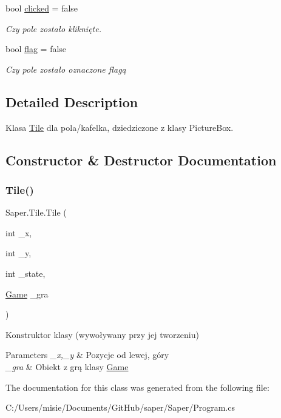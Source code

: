 \begin{DoxyCompactItemize}
\mbox{\label{class_saper_1_1_tile_a0b3e70fcbb158d0d48856f4f1c21e74c}} 
bool \mbox{\hyperlink{class_saper_1_1_tile_a0b3e70fcbb158d0d48856f4f1c21e74c}{clicked}} = false
\begin{DoxyCompactList}\small\item\em Czy pole zostało kliknięte. \end{DoxyCompactList}\item 
\mbox{\label{class_saper_1_1_tile_a558d8534615ae6ddcbdbef636b0b7d16}} 
bool \mbox{\hyperlink{class_saper_1_1_tile_a558d8534615ae6ddcbdbef636b0b7d16}{flag}} = false
\begin{DoxyCompactList}\small\item\em Czy pole zostało oznaczone flagą \end{DoxyCompactList}\end{DoxyCompactItemize}


\subsection{Detailed Description}
Klasa \mbox{\hyperlink{class_saper_1_1_tile}{Tile}} dla pola/kafelka, dziedziczone z klasy Picture\+Box. 

\subsection{Constructor \& Destructor Documentation}
\mbox{\label{class_saper_1_1_tile_a5225a6086870b9c2c9cad42ae248be68}} 
\subsubsection{\texorpdfstring{Tile()}{Tile()}}
{\footnotesize\ttfamily Saper.\+Tile.\+Tile (\begin{DoxyParamCaption}\item[{int}]{\+\_\+x,  }\item[{int}]{\+\_\+y,  }\item[{int}]{\+\_\+state,  }\item[{\mbox{\hyperlink{class_saper_1_1_game}{Game}}}]{\+\_\+gra }\end{DoxyParamCaption})}

Konstruktor klasy (wywoływany przy jej tworzeniu) 
\begin{DoxyParams}{Parameters}
{\em \+\_\+x,\+\_\+y} & Pozycje od lewej, góry \\
\hline
{\em \+\_\+gra} & Obiekt z grą klasy \mbox{\hyperlink{class_saper_1_1_game}{Game}} \\
\hline
\end{DoxyParams}


The documentation for this class was generated from the following file\+:\begin{DoxyCompactItemize}
\item 
C\+:/\+Users/misie/\+Documents/\+Git\+Hub/saper/\+Saper/Program.\+cs\end{DoxyCompactItemize}
